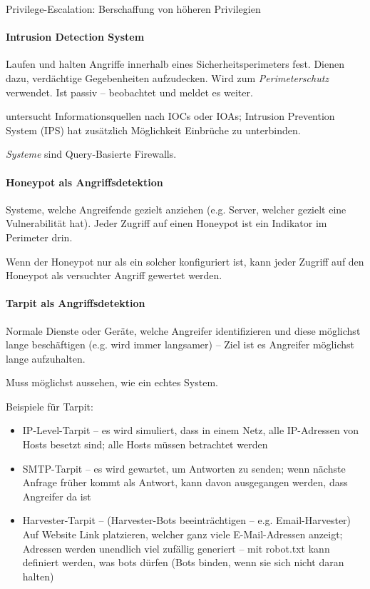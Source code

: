 \documentclass[a4paper,12pt]{article}
\begin{document}
Privilege-Escalation: Berschaffung von höheren Privilegien

\paragraph{Intrusion Detection System}
Laufen und halten Angriffe innerhalb eines Sicherheitsperimeters fest. Dienen dazu, verdächtige Gegebenheiten aufzudecken. Wird zum \emph{Perimeterschutz} verwendet. Ist passiv -- beobachtet und meldet es weiter.

untersucht Informationsquellen nach IOCs oder IOAs; Intrusion Prevention System (IPS) hat zusätzlich Möglichkeit Einbrüche zu unterbinden.

\emph{Systeme} sind Query-Basierte Firewalls.

\paragraph{Honeypot als Angriffsdetektion}
Systeme, welche Angreifende gezielt anziehen (e.g. Server, welcher gezielt eine Vulnerabilität hat). Jeder Zugriff auf einen Honeypot ist ein Indikator im Perimeter drin.

Wenn der Honeypot nur als ein solcher konfiguriert ist, kann jeder Zugriff auf den Honeypot als versuchter Angriff gewertet werden.

\paragraph{Tarpit als Angriffsdetektion}
Normale Dienste oder Geräte, welche Angreifer identifizieren und diese möglichst lange beschäftigen (e.g. wird immer langsamer) -- Ziel ist es Angreifer möglichst lange aufzuhalten.

Muss möglichst aussehen, wie ein echtes System.

Beispiele für Tarpit:
\begin{itemize}
\item IP-Level-Tarpit -- es wird simuliert, dass in einem Netz, alle IP-Adressen von Hosts besetzt sind; alle Hosts müssen betrachtet werden
\item SMTP-Tarpit -- es wird gewartet, um Antworten zu senden; wenn nächste Anfrage früher kommt als Antwort, kann davon ausgegangen werden, dass Angreifer da ist
\item Harvester-Tarpit -- (Harvester-Bots beeinträchtigen -- e.g. Email-Harvester) Auf Website Link platzieren, welcher ganz viele E-Mail-Adressen anzeigt; Adressen werden unendlich viel zufällig generiert -- mit robot.txt kann definiert werden, was bots dürfen (Bots binden, wenn sie sich nicht daran halten)
\end{itemize}
\end{document}
